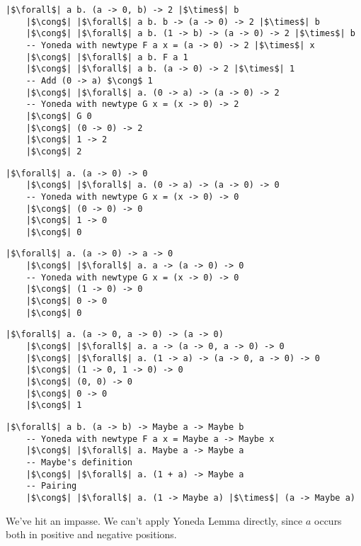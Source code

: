 \documentclass[tikz]{beamer}
\theoremstyle{definition}
\begin{document}
\begin{frame}[fragile]
\begin{verbatim}
|$\forall$| a b. (a -> 0, b) -> 2 |$\times$| b
    |$\cong$| |$\forall$| a b. b -> (a -> 0) -> 2 |$\times$| b
    |$\cong$| |$\forall$| a b. (1 -> b) -> (a -> 0) -> 2 |$\times$| b
    -- Yoneda with newtype F a x = (a -> 0) -> 2 |$\times$| x
    |$\cong$| |$\forall$| a b. F a 1
    |$\cong$| |$\forall$| a b. (a -> 0) -> 2 |$\times$| 1
    -- Add (0 -> a) $\cong$ 1
    |$\cong$| |$\forall$| a. (0 -> a) -> (a -> 0) -> 2
    -- Yoneda with newtype G x = (x -> 0) -> 2
    |$\cong$| G 0
    |$\cong$| (0 -> 0) -> 2
    |$\cong$| 1 -> 2
    |$\cong$| 2
\end{verbatim}
\end{frame}

\begin{frame}[fragile]
\begin{verbatim}
|$\forall$| a. (a -> 0) -> 0
    |$\cong$| |$\forall$| a. (0 -> a) -> (a -> 0) -> 0
    -- Yoneda with newtype G x = (x -> 0) -> 0
    |$\cong$| (0 -> 0) -> 0
    |$\cong$| 1 -> 0
    |$\cong$| 0
\end{verbatim}
\end{frame}

\begin{frame}[fragile]
\begin{verbatim}
|$\forall$| a. (a -> 0) -> a -> 0
    |$\cong$| |$\forall$| a. a -> (a -> 0) -> 0
    -- Yoneda with newtype G x = (x -> 0) -> 0
    |$\cong$| (1 -> 0) -> 0
    |$\cong$| 0 -> 0
    |$\cong$| 0
\end{verbatim}
\end{frame}

\begin{frame}[fragile]
\begin{verbatim}
|$\forall$| a. (a -> 0, a -> 0) -> (a -> 0)
    |$\cong$| |$\forall$| a. a -> (a -> 0, a -> 0) -> 0
    |$\cong$| |$\forall$| a. (1 -> a) -> (a -> 0, a -> 0) -> 0
    |$\cong$| (1 -> 0, 1 -> 0) -> 0
    |$\cong$| (0, 0) -> 0
    |$\cong$| 0 -> 0
    |$\cong$| 1
\end{verbatim}
\end{frame}


\begin{frame}[fragile]
\begin{verbatim}
|$\forall$| a b. (a -> b) -> Maybe a -> Maybe b
    -- Yoneda with newtype F a x = Maybe a -> Maybe x
    |$\cong$| |$\forall$| a. Maybe a -> Maybe a
    -- Maybe's definition
    |$\cong$| |$\forall$| a. (1 + a) -> Maybe a
    -- Pairing
    |$\cong$| |$\forall$| a. (1 -> Maybe a) |$\times$| (a -> Maybe a)
\end{verbatim}

We've hit an impasse. We can't apply Yoneda Lemma directly, since $a$ occurs both in positive and negative positions.
\end{frame}
\end{document}
